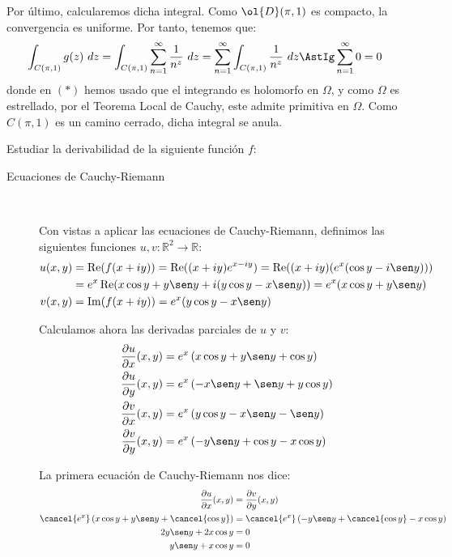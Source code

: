 \documentclass[12pt]{article}
\renewcommand{\Re}{\operatorname{Re}} %
\renewcommand{\Im}{\operatorname{Im}}
\begin{document}
\begin{ejercicio}[4 puntos]
        Por último, calcularemos dicha integral. Como $\ol{D}(\pi,1)$ es compacto, la convergencia es uniforme. Por tanto, tenemos que:
        \begin{align*}
            \int_{C(\pi,1)} g(z) \ dz &= \int_{C(\pi,1)} \sum_{n=1}^{\infty} \frac{1}{n^z} \ dz = \sum_{n=1}^{\infty} \int_{C(\pi,1)} \frac{1}{n^z} \ dz \AstIg \sum_{n=1}^{\infty} 0 = 0
        \end{align*}
        donde en $(\ast)$ hemos usado que el integrando es holomorfo en $\Omega$, y como $\Omega$ es estrellado, por el Teorema Local de Cauchy, este admite primitiva en $\Omega$. Como $C(\pi,1)$ es un camino cerrado, dicha integral se anula.
    \end{ejercicio}

    \begin{ejercicio}[3 puntos]
        Estudiar la derivabilidad de la siguiente función $f$:

        \begin{description}
            \item[Ecuaciones de Cauchy-Riemann]~
            
            Con vistas a aplicar las ecuaciones de Cauchy-Riemann, definimos las siguientes funciones $u,v:\mathbb{R}^2\to\mathbb{R}$:
        \begin{align*}
            u(x,y) &= \Re(f(x+iy)) = \Re((x+iy)e^{x-iy}) = \Re((x+iy)(e^x(\cos y - i\sen y)))\\
            &= e^x\Re(x\cos y +y\sen y + i(y\cos y - x\sen y)) = e^x(x\cos y +y\sen y)\\
            v(x,y) &= \Im(f(x+iy)) = e^x(y\cos y - x\sen y)
        \end{align*}

        Calculamos ahora las derivadas parciales de $u$ y $v$:
        \begin{align*}
            \frac{\partial u}{\partial x}(x,y) &= e^x\left(x\cos y + y\sen y+\cos y\right)\\
            \frac{\partial u}{\partial y}(x,y) &= e^x\left(-x\sen y + \sen y + y\cos y\right)\\
            \frac{\partial v}{\partial x}(x,y) &= e^x\left(y\cos y -x\sen y -\sen y\right)\\
            \frac{\partial v}{\partial y}(x,y) &= e^x\left(-y\sen y + \cos y - x\cos y\right)
        \end{align*}

        La primera ecuación de Cauchy-Riemann nos dice:
        \begin{align*}
            \frac{\partial u}{\partial x}(x,y) &= \frac{\partial v}{\partial y}(x,y)\\
            \cancel{e^x}\left(x\cos y + y\sen y+\cancel{\cos y}\right) &= \cancel{e^x}\left(-y\sen y + \cancel{\cos y} - x\cos y\right)\\
            2y\sen y + 2x\cos y &= 0\\
            y\sen y + x\cos y &= 0
        \end{align*}


\end{description}
\end{ejercicio}
\end{document}
